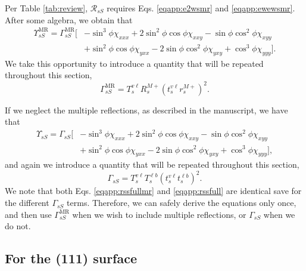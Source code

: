 Per Table \ref{tab:review}, $\mathcal{R}_{sS}$ requires Eqs.
\eqref{eqapp:e2wsmr} and \eqref{eqapp:ewewsmr}. After some algebra, we obtain
that
\begin{equation}\label{eqapp:rssfullmr}
\begin{split}
\Upsilon^{\mathrm{MR}}_{sS} = 
\Gamma^{\mathrm{MR}}_{sS}
\big[
&- \sin^{3}\phi\chi_{xxx}
 + 2\sin^{2}\phi\cos\phi\chi_{xxy}
 - \sin\phi\cos^{2}\phi\chi_{xyy}\\
&+ \sin^{2}\phi\cos\phi\chi_{yxx}
 - 2\sin\phi\cos^{2}\phi\chi_{yxy}
 + \cos^{3}\phi\chi_{yyy}
\big].
\end{split}
\end{equation}
We take this opportunity to introduce a quantity that will be repeated
throughout this section,
\begin{equation}\label{eqapp:gammassmr}
\Gamma^{\mathrm{MR}}_{sS} =
T_{s}^{v\ell}R^{M+}_{s}\left(t^{v\ell}_{s}r^{M+}_{s}\right)^{2}.
\end{equation}

If we neglect the multiple reflections, as described in the manuscript, we have
that
\begin{equation}\label{eqapp:rssfull}
\begin{split}
\Upsilon_{sS} =
\Gamma_{sS}
\big[
&- \sin^{3}\phi\chi_{xxx}
 + 2\sin^{2}\phi\cos\phi\chi_{xxy}
 - \sin\phi\cos^{2}\phi\chi_{xyy}\\
&+ \sin^{2}\phi\cos\phi\chi_{yxx}
 - 2\sin\phi\cos^{2}\phi\chi_{yxy}
 + \cos^{3}\phi\chi_{yyy}
\big],
\end{split}
\end{equation}
and again we introduce a quantity that will be repeated throughout this section,
\begin{equation}\label{eqapp:gammass}
\Gamma_{sS} =
T^{v\ell}_{s}T^{\ell b}_{s}\left(t^{v\ell}_{s}t^{\ell b}_{s}\right)^{2}.
\end{equation}
We note that both Eqs. \eqref{eqapp:rssfullmr} and \eqref{eqapp:rssfull} are identical
save for the different $\Gamma_{sS}$ terms. Therefore, we can safely derive the
equations only once, and then use $\Gamma^{\mathrm{MR}}_{sS}$ when we wish to
include multiple reflections, or $\Gamma_{sS}$ when we do not.


\subsection{For the (111) surface}

